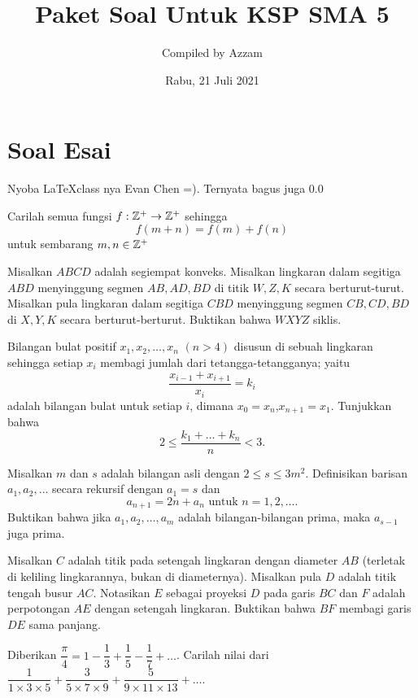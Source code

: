 \documentclass[11pt]{scrartcl}
\begin{document}
	\title{Paket Soal Untuk KSP SMA 5} %
	\date{Rabu, 21 Juli 2021}
	\author{Compiled by Azzam}
	\maketitle
	
	
	\section{Soal Esai}
	Nyoba \LaTeX   class nya Evan Chen =). Ternyata bagus juga 0.0
	\begin{soalbaru}
		Carilah semua fungsi $f:\mathbb Z^+ \to \mathbb Z^+$ sehingga $$f(m+n)=f(m)+f(n)$$ untuk sembarang $m,n \in \mathbb Z^+$
	\end{soalbaru}

	\begin{soalbaru}
		Misalkan $ABCD$ adalah segiempat konveks. Misalkan lingkaran dalam segitiga $ABD$ menyinggung segmen $AB,AD,BD$ di titik $W,Z,K$ secara berturut-turut. Misalkan pula lingkaran dalam segitiga $CBD$ menyinggung segmen $CB,CD,BD$ di $X,Y,K$ secara berturut-berturut. Buktikan bahwa $WXYZ$ siklis.
	\end{soalbaru}

	\begin{soalbaru}
		Bilangan bulat positif $x_1,x_2,\dots, x_n$ $(n>4)$ disusun di sebuah lingkaran sehingga setiap $x_i$ membagi jumlah dari tetangga-tetangganya; yaitu 
		$$\dfrac{x_{i-1}+x_{i+1}}{x_{i}}=k_i$$ adalah bilangan bulat untuk setiap $i$, dimana $x_0=x_n$,$x_{n+1}=x_1$. Tunjukkan bahwa 
		$$ 2 \le \dfrac{k_1+\dots+k_n}{n} < 3.$$
	\end{soalbaru}

	\begin{soalbaru}
		Misalkan $m$ dan $s$ adalah bilangan asli dengan $2 \le s \le 3m^2.$ Definisikan barisan $a_1,a_2,\dots$ secara rekursif dengan $a_1=s$ dan $$a_{n+1} = 2n + a_n \text{    untuk   }  n=1,2,\dots.$$
		Buktikan bahwa jika $a_1,a_2,\dots,a_m$ adalah bilangan-bilangan prima, maka $a_{s-1}$ juga prima. 
	\end{soalbaru}
	
	\begin{soalbaru}
	Misalkan $C$ adalah titik pada setengah lingkaran dengan diameter $AB$ (terletak di keliling lingkarannya, bukan di diameternya). Misalkan pula $D$ adalah titik tengah busur $AC$. Notasikan $E$ sebagai proyeksi $D$ pada garis $BC$ dan $F$ adalah perpotongan $AE$ dengan setengah lingkaran. Buktikan bahwa $BF$ membagi garis $DE$ sama panjang.
	\end{soalbaru}
	
	\begin{soalbaru}
	Diberikan $\dfrac{\pi}{4} = 1 - \dfrac{1}{3}+\dfrac{1}{5}-\dfrac{1}{7}+\dots$. Carilah nilai dari $\dfrac{1}{1 \times 3 \times 5}+\dfrac{3}{5 \times 7 \times 9}+\dfrac{5}{9 \times 11 \times 13}+\dots$.
	\end{soalbaru}
\end{document}

